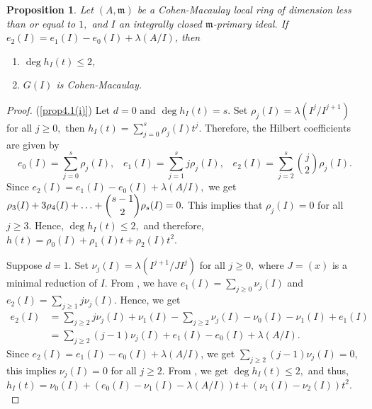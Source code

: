 \documentclass[11pt]{amsart}
\theoremstyle{plain}
\newtheorem{proposition}[theorem]{Proposition}
\newcommand{\m}{\mathfrak{m}}
\theoremstyle{plain}
\begin{document}
 
\begin{proposition} \label{prop4.1}
    Let $(A, \m) $ be a Cohen-Macaulay local ring of dimension less than or equal to $1,$ and $I$ an integrally closed $\m$-primary ideal. If $e_{2}(I)=e_{1}(I)-e_{0}(I)+\lambda(A/I)$, then 
    \begin{enumerate}[\normalfont(i)]
        \item \label{prop4.1(i)} $\deg h_{I}(t)\leq 2$,
        \item \label{prop4.1(ii)} $G(I)$ is Cohen-Macaulay.
    \end{enumerate}
\end{proposition}
\begin{proof}
(\ref{prop4.1(i)})
 Let $d=0$ and $\deg h_{I}(t)=s.$ Set $\rho_{j}(I)=\lambda(I^{j}/I^{j+1})$ for all $j\geq 0,$ then  $h_{I}(t)=\displaystyle \sum_{j=0}^{s}\rho_{j}(I)t^{j}.$  Therefore, the Hilbert coefficients are given by 
        $$ e_{0}(I)=\sum_{j=0}^{s}\rho_{j}(I), \hspace{10pt} e_{1}(I)=\sum_{j=1}^{s}j\rho_{j}(I), \hspace{10pt} e_{2}(I)=\sum_{j=2}^{s}\binom{j}{2}\rho_{j}(I).$$
Since $e_{2}(I)=e_{1}(I)-e_{0}(I)+\lambda(A/I),$   we get $\rho_{3}(I)+3\rho_{4}(I)+\ldots+\dbinom{s-1}{2} \rho_{s}(I)=0.$ This implies that $\rho_{j}(I)=0$ for all $j \geq 3.$ Hence, $\deg h_I(t) \leq 2,$ and therefore, $h(t)=\rho_{0}(I)+\rho_{1}(I)t+\rho_{2}(I)t^2.$

Suppose $d=1$. Set $\nu_{j}(I)=\lambda(I^{j+1}/JI^{j})$ for all $j\geq 0,$ where $J=(x)$ is a minimal reduction of $I.$ From \cite[Theorem 2.5$(c)$]{rossi2010hilbert}, we have $e_{1}(I)=\displaystyle \sum_{j\geq0}\nu_{j}(I)$ and $e_{2}(I)=\displaystyle \sum_{j\geq1}j\nu_{j}(I).$ Hence, we get
\begin{equation*}
    \begin{split}
          e_{2}(I)&%
    =\displaystyle \sum_{j\geq2}j\nu_{j}(I)+\nu_{1}(I)-\sum_{j\geq2}\nu_{j}(I)-\nu_{0}(I)-\nu_{1}(I)+e_{1}(I)\\
    &=\displaystyle \sum_{j\geq2}(j-1)\nu_{j}(I)+e_{1}(I)-e_{0}(I)+\lambda(A/I).
    \end{split}
\end{equation*}
  Since $e_{2}(I)=e_{1}(I)-e_{0}(I)+\lambda(A/I)$, we get $ \displaystyle \sum_{j\geq2}(j-1)\nu_{j}(I)=0$, this implies $\nu_{j}(I)=0$ for all $j \geq 2.$ From \cite[Theorem 2.5$(c)$]{rossi2010hilbert}, we get $\deg h_I(t) \leq 2,$ and thus,   $h_{I}(t)=\nu_{0}(I)+(e_{0}(I)-\nu_{1}(I)-\lambda(A/I))t+(\nu_{1}(I)-\nu_{2}(I))t^{2}.$
  

\end{proof}
\end{document}
